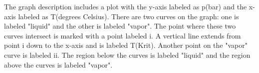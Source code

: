 The graph description includes a plot with the y-axis labeled as p(bar) and the x-axis labeled as T(degrees Celsius). There are two curves on the graph: one is labeled "liquid" and the other is labeled "vapor". The point where these two curves intersect is marked with a point labeled i. A vertical line extends from point i down to the x-axis and is labeled T(Krit). Another point on the "vapor" curve is labeled ii. The region below the curves is labeled "liquid" and the region above the curves is labeled "vapor".